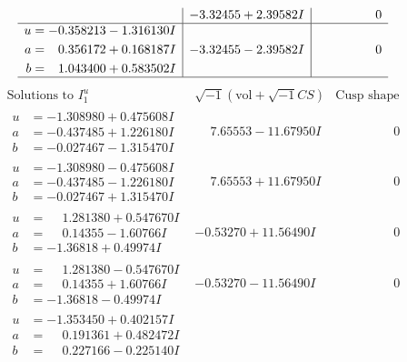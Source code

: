 \documentclass[1p]{elsarticle_modified}
\theoremstyle{definition}
\newcommand{\I}{\sqrt{-1}}
\begin{document}
$$\begin{array}{c|c|c}
 & -3.32455 + 2.39582 I & \phantom{-0.000000 } 0 \\ \hline\begin{aligned}
u &= -0.358213 - 1.316130 I \\
a &= \phantom{-}0.356172 + 0.168187 I \\
b &= \phantom{-}1.043400 + 0.583502 I\end{aligned}
 & -3.32455 - 2.39582 I & \phantom{-0.000000 } 0\\
 \hline 
 \end{array}$$\newpage$$\begin{array}{c|c|c}  
\text{Solutions to }I^u_{1}& \I (\text{vol} + \sqrt{-1}CS) & \text{Cusp shape}\\
 \hline 
\begin{aligned}
u &= -1.308980 + 0.475608 I \\
a &= -0.437485 + 1.226180 I \\
b &= -0.027467 - 1.315470 I\end{aligned}
 & \phantom{-}7.65553 - 11.67950 I & \phantom{-0.000000 } 0 \\ \hline\begin{aligned}
u &= -1.308980 - 0.475608 I \\
a &= -0.437485 - 1.226180 I \\
b &= -0.027467 + 1.315470 I\end{aligned}
 & \phantom{-}7.65553 + 11.67950 I & \phantom{-0.000000 } 0 \\ \hline\begin{aligned}
u &= \phantom{-}1.281380 + 0.547670 I \\
a &= \phantom{-}0.14355 - 1.60766 I \\
b &= -1.36818 + 0.49974 I\end{aligned}
 & -0.53270 + 11.56490 I & \phantom{-0.000000 } 0 \\ \hline\begin{aligned}
u &= \phantom{-}1.281380 - 0.547670 I \\
a &= \phantom{-}0.14355 + 1.60766 I \\
b &= -1.36818 - 0.49974 I\end{aligned}
 & -0.53270 - 11.56490 I & \phantom{-0.000000 } 0 \\ \hline\begin{aligned}
u &= -1.353450 + 0.402157 I \\
a &= \phantom{-}0.191361 + 0.482472 I \\
b &= \phantom{-}0.227166 - 0.225140 I\end{aligned}

\end{array}$$
\end{document}
